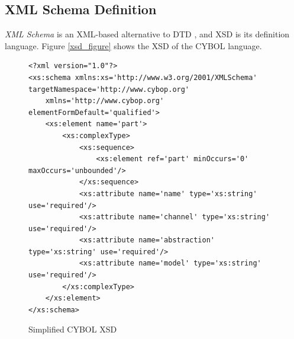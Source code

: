 %
%
%
%
%
%

\subsection{XML Schema Definition}
\label{xml_schema_definition_heading}

\emph{XML Schema} is an XML-based alternative to DTD \cite{w3schools}, and XSD
is its definition language. Figure \ref{xsd_figure} shows the XSD of the CYBOL
language.

\begin{figure}[ht]
    \bigskip
    \bigskip
    \begin{scriptsize}
        \begin{verbatim}
<?xml version="1.0"?>
<xs:schema xmlns:xs='http://www.w3.org/2001/XMLSchema' targetNamespace='http://www.cybop.org'
    xmlns='http://www.cybop.org' elementFormDefault='qualified'>
    <xs:element name='part'>
        <xs:complexType>
            <xs:sequence>
                <xs:element ref='part' minOccurs='0' maxOccurs='unbounded'/>
            </xs:sequence>
            <xs:attribute name='name' type='xs:string' use='required'/>
            <xs:attribute name='channel' type='xs:string' use='required'/>
            <xs:attribute name='abstraction' type='xs:string' use='required'/>
            <xs:attribute name='model' type='xs:string' use='required'/>
        </xs:complexType>
    </xs:element>
</xs:schema>
        \end{verbatim}
    \end{scriptsize}
    \caption{Simplified CYBOL XSD}
    \label{simplexsd_figure}
\end{figure}

